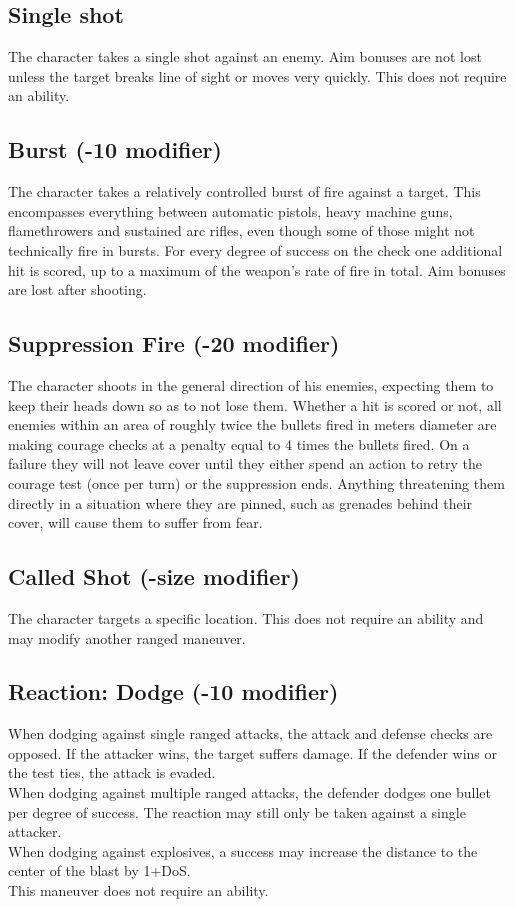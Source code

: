 \documentclass[12pt,a4paper]{book}
\begin{document}
	\subsection*{Single shot}
	The character takes a single shot against an enemy. Aim bonuses are not lost unless the target breaks line of sight or moves very quickly. This does not require an ability.
	\subsection*{Burst (-10 modifier)}
	The character takes a relatively controlled burst of fire against a target. This encompasses everything between automatic pistols, heavy machine guns, flamethrowers and sustained arc rifles, even though some of those might not technically fire in bursts. For every degree of success on the check one additional hit is scored, up to a maximum of the weapon’s rate of fire in total. Aim bonuses are lost after shooting.
	\subsection*{Suppression Fire (-20 modifier)}
	The character shoots in the general direction of his enemies, expecting them to keep their heads down so as to not lose them. Whether a hit is scored or not, all enemies within an area of roughly twice the bullets fired in meters diameter are making courage checks at a penalty equal to 4 times the bullets fired. On a failure they will not leave cover until they either spend an action to retry the courage test (once per turn) or the suppression ends. Anything threatening them directly in a situation where they are pinned, such as grenades behind their cover, will cause them to suffer from fear.
	\subsection*{Called Shot (-size modifier)}
	The character targets a specific location. This does not require an ability and may modify another ranged maneuver.
	\subsection*{Reaction: Dodge (-10 modifier)}
	When dodging against single ranged attacks, the attack and defense checks are opposed. If the attacker wins, the target suffers damage. If the defender wins or the test ties, the attack is evaded.\\
	When dodging against multiple ranged attacks, the defender dodges one bullet per degree of success. The reaction may still only be taken against a single attacker.\\
	When dodging against explosives, a success may increase the distance to the center of the blast by 1+DoS.\\
	This maneuver does not require an ability.
\end{document}
